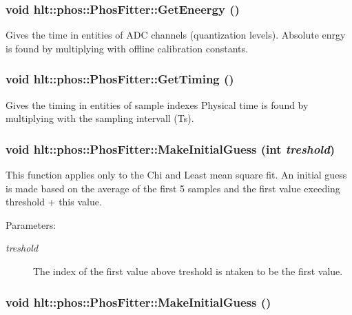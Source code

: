 \subsubsection{\setlength{\rightskip}{0pt plus 5cm}void hlt::phos::Phos\-Fitter::Get\-Eneergy ()}\label{classhlt_1_1phos_1_1PhosFitter_a12}


Gives the time in entities of ADC channels (quantization levels). Absolute enrgy is found by multiplying with offline calibration constants. 
\subsubsection{\setlength{\rightskip}{0pt plus 5cm}void hlt::phos::Phos\-Fitter::Get\-Timing ()}\label{classhlt_1_1phos_1_1PhosFitter_a11}


Gives the timing in entities of sample indexes Physical time is found by multiplying with the sampling intervall (Ts). 
\subsubsection{\setlength{\rightskip}{0pt plus 5cm}void hlt::phos::Phos\-Fitter::Make\-Initial\-Guess (int {\em treshold})\hspace{0.3cm}{\tt  [private]}}\label{classhlt_1_1phos_1_1PhosFitter_d1}


This function applies only to the Chi and Least mean square fit. An initial guess is made based on the average of the first 5 samples and the first value exeeding threshold + this value. \begin{Desc}
\item[Parameters:]
\begin{description}
\item[{\em treshold}]The index of the first value above treshold is ntaken to be the first value. \end{description}
\end{Desc}
\subsubsection{\setlength{\rightskip}{0pt plus 5cm}void hlt::phos::Phos\-Fitter::Make\-Initial\-Guess ()\hspace{0.3cm}{\tt  [private]}}\label{classhlt_1_1phos_1_1PhosFitter_d0}


